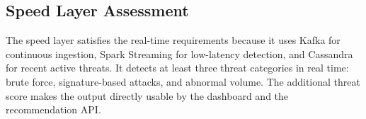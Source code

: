 \subsection{Speed Layer Assessment}

The speed layer satisfies the real-time requirements because it uses Kafka for continuous ingestion, Spark Streaming for low-latency detection, and Cassandra for recent active threats. It detects at least three threat categories in real time: brute force, signature-based attacks, and abnormal volume. The additional threat score makes the output directly usable by the dashboard and the recommendation API.
